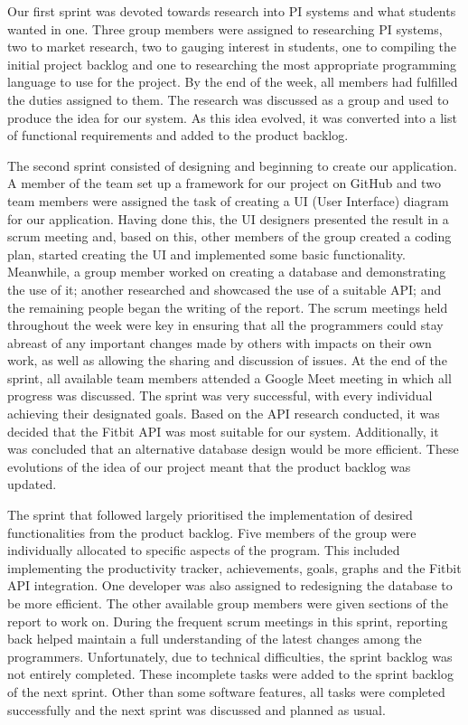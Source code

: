 \documentclass[12pt]{article}
\begin{document}
Our first sprint was devoted towards research into PI systems and what students wanted in one. Three group members were assigned to researching PI systems, two to market research, two to gauging interest in students, one to compiling the initial project backlog and one to researching the most appropriate programming language to use for the project. By the end of the week, all members had fulfilled the duties assigned to them. The research was discussed as a group and used to produce the idea for our system. As this idea evolved, it was converted into a list of functional requirements and added to the product backlog.\par

The second sprint consisted of designing and beginning to create our application. A member of the team set up a framework for our project on GitHub and two team members were assigned the task of creating a UI (User Interface) diagram for our application. Having done this, the UI designers presented the result in a scrum meeting and, based on this, other members of the group created a coding plan, started creating the UI and implemented some basic functionality. Meanwhile, a group member worked on creating a database and demonstrating the use of it; another researched and showcased the use of a suitable API; and the remaining people began the writing of the report. The scrum meetings held throughout the week were key in ensuring that all the programmers could stay abreast of any important changes made by others with impacts on their own work, as well as allowing the sharing and discussion of issues. At the end of the sprint, all available team members attended a Google Meet meeting in which all progress was discussed. The sprint was very successful, with every individual achieving their designated goals. Based on the API research conducted, it was decided that the Fitbit API was most suitable for our system. Additionally, it was concluded that an alternative database design would be more efficient. These evolutions of the idea of our project meant that the product backlog was updated.\par

The sprint that followed largely prioritised the implementation of desired functionalities from the product backlog. Five members of the group were individually allocated to specific aspects of the program. This included implementing the productivity tracker, achievements, goals, graphs and the Fitbit API integration. One developer was also assigned to redesigning the database to be more efficient. The other available group members were given sections of the report to work on. During the frequent scrum meetings in this sprint, reporting back helped maintain a full understanding of the latest changes among the programmers. Unfortunately, due to technical difficulties, the sprint backlog was not entirely completed. These incomplete tasks were added to the sprint backlog of the next sprint. Other than some software features, all tasks were completed successfully and the next sprint was discussed and planned as usual.\par
\end{document}
